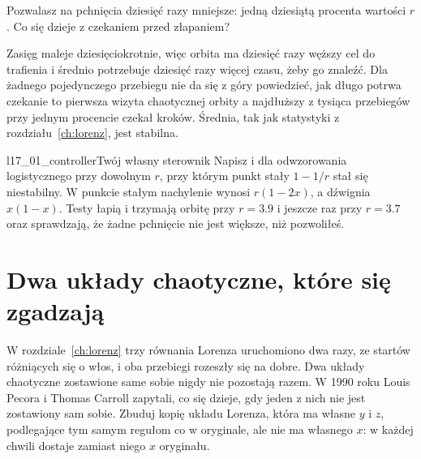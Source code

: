 \begin{think}
Pozwalasz na pchnięcia dziesięć razy mniejsze: jedną dziesiątą procenta
wartości $r$. Co się dzieje z czekaniem przed złapaniem?
\end{think}



\noindent
Zasięg maleje dziesięciokrotnie, więc orbita ma dziesięć razy węższy cel do
trafienia i średnio potrzebuje dziesięć razy więcej czasu, żeby go znaleźć.
Dla żadnego pojedynczego przebiegu nie da się z góry powiedzieć, jak długo
potrwa czekanie \dash{} to pierwsza wizyta chaotycznej orbity \dash{} a
najdłuższy z tysiąca przebiegów przy jednym procencie czekał
 kroków. Średnia, tak jak statystyki z
rozdziału~\ref{ch:lorenz}, jest stabilna.

\begin{lab}{l17_01_controller}{Twój własny sterownik}
Napisz  i  dla odwzorowania logistycznego przy
dowolnym $r$, przy którym punkt stały $1 - 1/r$ stał się niestabilny. W
punkcie stałym nachylenie wynosi $r(1 - 2x)$, a dźwignia $x(1 - x)$. Testy
łapią i trzymają orbitę przy $r = \num{3.9}$ i jeszcze raz przy
$r = \num{3.7}$ oraz sprawdzają, że żadne pchnięcie nie jest większe, niż
pozwoliłeś.
\end{lab}

\section{Dwa układy chaotyczne, które się zgadzają}
\label{sec:ch17-sync}

\noindent
W rozdziale~\ref{ch:lorenz} trzy równania Lorenza uruchomiono dwa razy, ze
startów różniących się o włos, i oba przebiegi rozeszły się na dobre. Dwa układy chaotyczne zostawione same sobie nigdy nie pozostają
razem. W 1990 roku Louis Pecora i Thomas Carroll zapytali, co się dzieje,
gdy jeden z nich nie jest zostawiony sam sobie. Zbuduj kopię układu Lorenza,
która ma własne $y$ i $z$, podlegające tym samym regułom co w oryginale, ale
nie ma własnego $x$: w każdej chwili dostaje zamiast niego $x$ oryginału.

